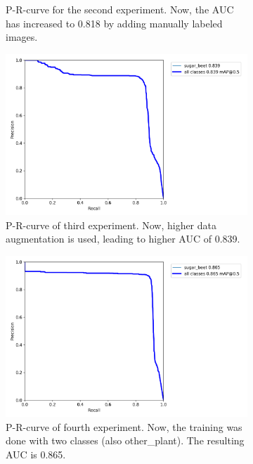 \begin{figure}[htb!]
\begin{subfigure}{.5\textwidth}
		\caption{P-R-curve for the second experiment. Now, the AUC has increased to 0.818 by adding manually labeled images. }
		\label{fig:AUC_2}
	\end{subfigure}
	\begin{subfigure}{.5\textwidth}
		\centering
		\includegraphics[scale=0.08]{figures/no_pre_high_dat.png}
		\caption{P-R-curve of third experiment. Now, higher data augmentation is used, leading to higher AUC of 0.839.}
		\label{fig:AUC_3}
	\end{subfigure}
	\begin{subfigure}{.5\textwidth}
		\centering
		\includegraphics[scale=0.08]{figures/yes_pre_low_dat.png}
		\caption{P-R-curve of fourth experiment. Now, the training was done with two classes (also other\_plant). The resulting AUC is 0.865.}
		\label{fig:AUC_4}
	\end{subfigure}
	\begin{subfigure}{1\textwidth}

\end{subfigure}
\end{figure}
